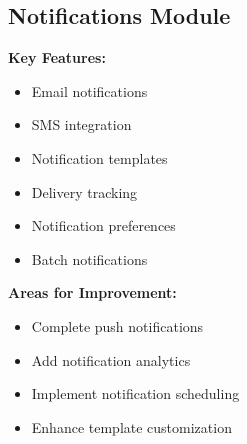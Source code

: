 \subsection{Notifications Module}
\begin{tcolorbox}[
    enhanced,
    title={Notifications Module: 60\% Complete},
    attach boxed title to top left,
    boxed title style={
        colback=warning!50,
        colframe=warning!50,
        arc=0mm,
    },
    colback=white,
    colframe=warning!50,
    arc=0mm,
    fonttitle=\bfseries
]
    \textbf{Key Features:}
    \begin{itemize}
        \item Email notifications
        \item SMS integration
        \item Notification templates
        \item Delivery tracking
        \item Notification preferences
        \item Batch notifications
    \end{itemize}
    
    \textbf{Areas for Improvement:}
    \begin{itemize}
        \item Complete push notifications
        \item Add notification analytics
        \item Implement notification scheduling
        \item Enhance template customization
    \end{itemize}
\end{tcolorbox}

